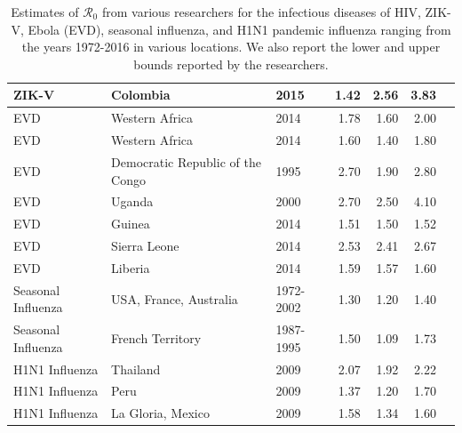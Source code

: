 \documentclass[12pt]{article}
\newcommand{\rr}{\ensuremath{\mathcal{R}_0}}
\begin{document}
\begin{landscape}
\begin{table}[H]
\begin{tabular}{@{}lllrrrl@{}}
ZIK-V                & Colombia                         & 2015                          & 1.42        & 2.56           & 3.83           & \cite{majumder2016}  \\ \hline
EVD               & Western Africa                   & 2014                          & 1.78        & 1.60            & 2.00              & \cite{fisman2014}   \\
EVD & Western Africa                   & 2014                          & 1.60         & 1.40            & 1.80            & \cite{towers2014}  \\
EVD                 & Democratic Republic of the Congo & 1995                          & 2.70         & 1.90            & 2.80            & \cite{legrand2007}  \\
EVD                 & Uganda                           & 2000                          & 2.70         & 2.50            & 4.10            & \cite{legrand2007}  \\
EVD                 & Guinea                           & 2014                          & 1.51        & 1.50            & 1.52           & \cite{althaus2014}   \\
EVD                 & Sierra Leone                     & 2014                          & 2.53        & 2.41           & 2.67           & \cite{althaus2014}      \\
EVD                 & Liberia                          & 2014                          & 1.59        & 1.57           & 1.60            & \cite{althaus2014}    \\ \hline
Seasonal Influenza  & USA, France, Australia           & 1972-2002 & 1.30         & 1.20            & 1.40            & \cite{chowell2008}  \\
Seasonal Influenza  & French Territory                 & 1987-1995                     & 1.50         & 1.09           & 1.73           & \cite{bonabeau1998}  \\ \hline
H1N1 Influenza      & Thailand                         & 2009                          & 2.07        & 1.92           & 2.22           & \cite{desilva2009}     \\
H1N1 Influenza     & Peru                             & 2009                          & 1.37        & 1.20            & 1.70            & \cite{desilva2009}        \\
H1N1 Influenza      & La Gloria, Mexico                  & 2009                          & 1.58        & 1.34           & 1.60            & \cite{fraser2009}     \\ \bottomrule
\end{tabular}
\caption{Estimates of $\rr$ from various researchers for the infectious diseases of HIV, ZIK-V, Ebola (EVD), seasonal influenza, and H1N1 pandemic influenza ranging from the years 1972-2016 in various locations.  We also report the lower and upper bounds reported by the researchers.}
\label{tab:r0-real-ex}
\end{table}
\end{landscape}
\end{document}
